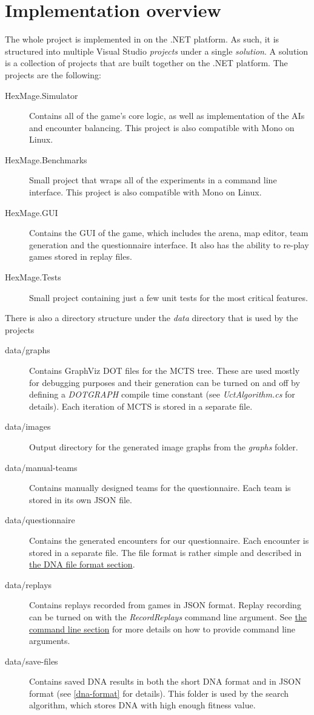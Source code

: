 \chapter{Implementation overview}
\label{implementation-overview}

The whole project is implemented in \Csh{} on the .NET platform. As such, it is structured
into multiple Visual Studio \emph{projects} under a single \emph{solution}. A solution is a collection
of projects that are built together on the .NET platform. The projects are
the following:

\begin{description}
	\item[HexMage.Simulator] Contains all of the game's core logic, as well as implementation of the AIs
		and encounter balancing. This project is also compatible with Mono on Linux.
	\item[HexMage.Benchmarks] Small project that wraps all of the experiments in a command line interface.
		This project is also compatible with Mono on Linux.
	\item[HexMage.GUI] Contains the GUI of the game, which includes the arena, map editor, team generation
		and the questionnaire interface. It also has the ability to re-play games stored in replay files.
	\item[HexMage.Tests] Small project containing just a few unit tests for the most critical features.
\end{description}

There is also a directory structure under the \emph{data} directory that is used by the projects

\begin{description}
	\item[data/graphs] Contains GraphViz DOT \citep{graphviz} files for the MCTS tree. These are used mostly for debugging purposes and their generation can be turned on and off by defining a \emph{DOTGRAPH} compile time constant (see \emph{UctAlgorithm.cs} for details). Each iteration of MCTS is stored in a separate file.
	\item[data/images] Output directory for the generated image graphs from the \emph{graphs} folder.
	\item[data/manual-teams] Contains manually designed teams for the questionnaire. Each team is stored in its own JSON \citep{json} file.
	\item[data/questionnaire] Contains the generated encounters for our questionnaire. Each encounter is stored
	in a separate file. The file format is rather simple and described in \hyperref[dna-format]{the DNA file format section}.
	\item[data/replays] Contains replays recorded from games in JSON format. Replay recording can be turned on with the \emph{RecordReplays} command line argument. See \hyperref[cmd-args]{the command line section} for more details on how to provide command line arguments.
	\item[data/save-files] Contains saved DNA results in both the short DNA format and in JSON format (see \autoref{dna-format} for details). This folder is used by the search algorithm, which stores DNA with high enough fitness value.
\end{description}

